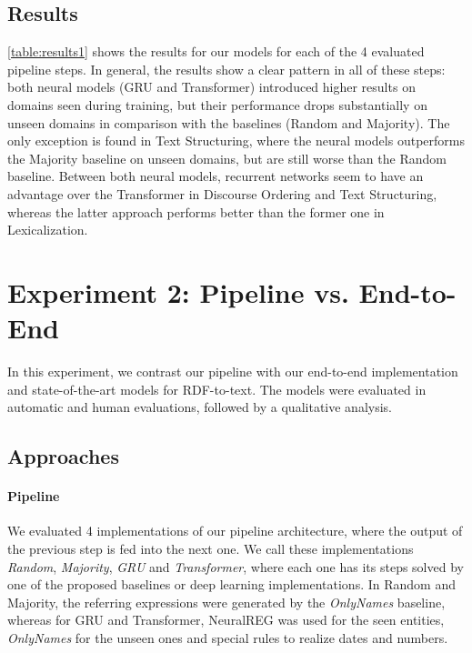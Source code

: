 \documentclass[11pt,a4paper]{article}
\begin{document}
\subsection{Results} 

\autoref{table:results1} shows the results for our models for each of the 4 evaluated pipeline steps. In general, the results show a clear pattern in all of these steps: both neural models (GRU and Transformer) introduced higher results on domains seen during training, but their performance drops substantially on unseen domains in comparison with the baselines (Random and Majority). The only exception is found in Text Structuring, where the neural models outperforms the Majority baseline on unseen domains, but are still worse than the Random baseline. Between both neural models, recurrent networks seem to have an advantage over the Transformer in Discourse Ordering and Text Structuring, whereas the latter approach performs better than the former one in Lexicalization.

\section{Experiment 2: Pipeline vs. End-to-End}

In this experiment, we contrast our pipeline with our end-to-end implementation and state-of-the-art models for RDF-to-text. The models were evaluated in automatic and human evaluations, followed by a qualitative analysis.

\subsection{Approaches}

\paragraph{Pipeline} We evaluated 4 implementations of our pipeline architecture, where the output of the previous step is fed into the next one. We call these implementations \textit{Random}, \textit{Majority}, \textit{GRU} and \textit{Transformer}, where each one has its steps solved by one of the proposed baselines or deep learning implementations. In Random and Majority, the referring expressions were generated by the \textit{OnlyNames} baseline, whereas for GRU and Transformer, NeuralREG was used for the seen entities, \textit{OnlyNames} for the unseen ones and special rules to realize dates and numbers.
\end{document}
